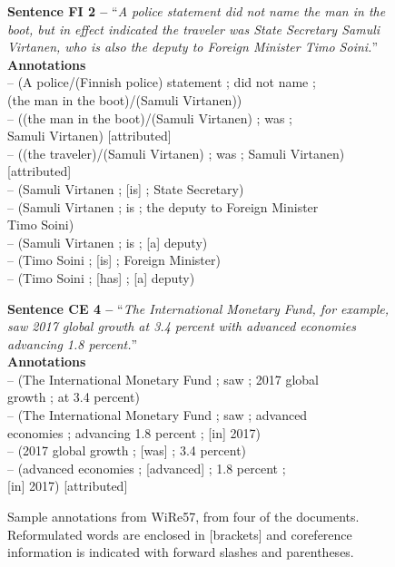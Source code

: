 \pdfoutput=1 \documentclass[11pt, a4paper]{article}
\begin{document}
\begin{figure}[htb!]
\textbf{Sentence FI 2 --} ``\textit{A police statement did not name the man
  in the boot, but in effect indicated the traveler was State Secretary Samuli
  Virtanen, who is also the deputy to Foreign Minister Timo Soini.}''
\smallskip\\\textbf{Annotations}
\\-- (A police/(Finnish police) statement ; did not name ;\\\-\hspace{50pt} (the man in the boot)/(Samuli Virtanen))
\\-- ((the man in the boot)/(Samuli Virtanen) ; was ; \\\-\hspace{50pt}Samuli Virtanen) [attributed]
\\-- ((the traveler)/(Samuli Virtanen) ; was ; Samuli Virtanen)\\\-\hspace{170pt} [attributed]
\\-- (Samuli Virtanen ; [is] ; State Secretary)
\\-- (Samuli Virtanen ; is ; the deputy to Foreign Minister \\\-\hspace{150pt}Timo Soini)
\\-- (Samuli Virtanen ; is ; [a] deputy)
\\-- (Timo Soini ; [is] ; Foreign Minister)
\\-- (Timo Soini ; [has] ; [a] deputy)
\\\smallskip\hrulefill

\textbf{Sentence CE 4 --} ``\textit{The International Monetary Fund, for example, saw 2017 global growth at 3.4 percent with advanced economies advancing 
1.8 percent.}''
\smallskip\\\textbf{Annotations}
\\-- (The International Monetary Fund ; saw ; 2017 global \\\-\hspace{130pt}growth ; at 3.4 percent)
\\-- (The International Monetary Fund ; saw ; advanced \\\-\hspace{50pt} economies ; advancing 1.8 percent ; [in] 2017)
\\-- (2017 global growth ; [was] ; 3.4 percent)
\\-- (advanced economies ; [advanced] ; 1.8 percent ; \\\-\hspace{138pt} [in] 2017) [attributed]
  \caption{Sample annotations from WiRe57, from four of the documents. Reformulated words are enclosed in [brackets] and coreference
    information is indicated with forward slashes and parentheses.}
  \label{fig-sample-annot}
\end{figure}
\end{document}

